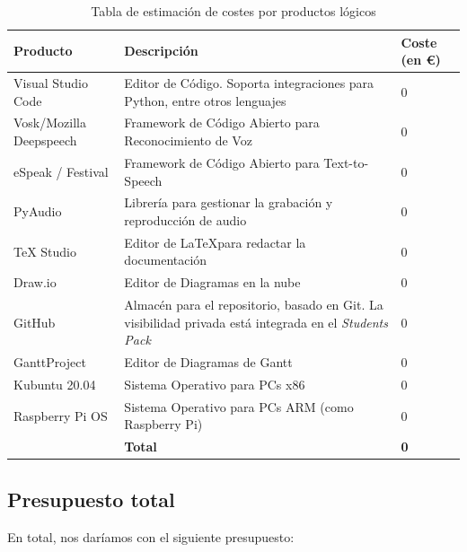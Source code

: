\begin{center}
	\begin{table}[H]
		\centering
		\begin{tabularx}{\textwidth}{|l|X|X|}
			\hline
			\cellcolor{lightblue}\textbf{Producto} & \cellcolor{lightblue}\textbf{Descripción} & \cellcolor{lightblue}\textbf{Coste (en €)} \\
			\hline
			Visual Studio Code & Editor de Código. Soporta integraciones para Python, entre otros lenguajes & 0 \\
			\hline
			Vosk/Mozilla Deepspeech & Framework de Código Abierto para Reconocimiento de Voz & 0 \\
			\hline
			eSpeak / Festival & Framework de Código Abierto para Text-to-Speech & 0 \\
			\hline
			PyAudio & Librería para gestionar la grabación y reproducción de audio & 0 \\
			\hline
			TeX Studio & Editor de \LaTeX  para redactar la documentación & 0 \\
			\hline
			Draw.io & Editor de Diagramas en la nube & 0 \\
			\hline
			GitHub & Almacén para el repositorio, basado en Git. La visibilidad privada está integrada en el \textit{Students Pack} & 0 \\
			\hline
			GanttProject & Editor de Diagramas de Gantt & 0 \\
			\hline
			Kubuntu 20.04 & Sistema Operativo para PCs x86 & 0 \\
			\hline
			Raspberry Pi OS  & Sistema Operativo para PCs ARM (como Raspberry Pi) & 0 \\
			\hline
			& \textbf{Total} & \textbf{0} \\
			\hline
		\end{tabularx}
		\caption{Tabla de estimación de costes por productos lógicos}
	\end{table}
\end{center}


\subsection{Presupuesto total}
En total, nos daríamos con el siguiente presupuesto:

